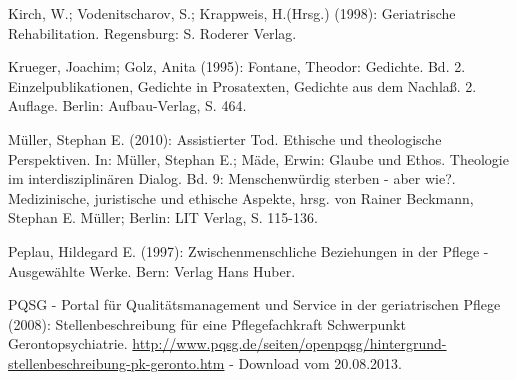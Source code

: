 \begin{thebibliography}{99}
	 Kirch, W.; Vodenitscharov, S.; Krappweis, H.(Hrsg.) (1998): Geriatrische Rehabilitation. Regensburg: S. Roderer Verlag.
	
	 Krueger, Joachim; Golz, Anita (1995): Fontane, Theodor: Gedichte. Bd. 2. Einzelpublikationen, Gedichte in Prosatexten, Gedichte aus dem Nachlaß. 2. Auflage. Berlin:  Aufbau-Verlag, S. 464.
	
	 Müller, Stephan E. (2010): Assistierter Tod. Ethische und theologische Perspektiven. In: Müller, Stephan E.; Mäde, Erwin: Glaube und Ethos. Theologie im interdisziplinären Dialog. Bd. 9: Menschenwürdig sterben - aber wie?.  Medizinische, juristische und ethische Aspekte, hrsg. von Rainer Beckmann, Stephan E. Müller; Berlin: LIT Verlag, S. 115-136.
	
	 Peplau, Hildegard E. (1997): Zwischenmenschliche Beziehungen in der Pflege - Ausgewählte Werke. Bern: Verlag Hans Huber.
	
	 PQSG - Portal für Qualitätsmanagement und Service in der geriatrischen Pflege (2008): Stellenbeschreibung für eine Pflegefachkraft Schwerpunkt Gerontopsychiatrie. \url{http://www.pqsg.de/seiten/openpqsg/hintergrund-stellenbeschreibung-pk-geronto.htm} - Download vom 20.08.2013.
	
\end{thebibliography}
